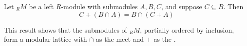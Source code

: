 \documentclass[12pt]{article}
\begin{document}
Let $_RM$ be a left $R$-module with submodules $A, B, C$, and suppose
$C \subseteq B$.  Then
\[ C + (B \cap A) = B \cap (C+A) \]

This result shows that the submodules of $_RM$, partially ordered by inclusion, form a modular lattice with $\cap$ as the meet and $+$ as the .
\end{document}
